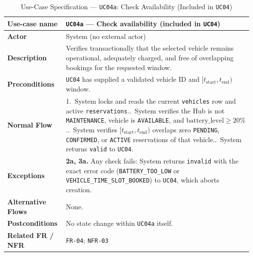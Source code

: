 \begin{table}[H]
  \centering
  \singlespacing\footnotesize
  \caption{Use-Case Specification --- \texttt{UC04a}: Check Availability (Included in \texttt{UC04})}
  \label{tab:uc04a}
  \renewcommand{\arraystretch}{1.13}
  \begin{tabularx}{\textwidth}{|L{2.9cm}|Y|}
    \hline
    \textbf{Use-case name} & \textbf{\texttt{UC04a} --- Check availability (included in \texttt{UC04})} \\
    \hline
    \textbf{Actor} & System (no external actor) \\
    \hline
    \textbf{Description} & Verifies transactionally that the selected vehicle remains operational, adequately charged, and free of overlapping bookings for the requested window. \\
    \hline
    \textbf{Preconditions} & \texttt{UC04} has supplied a validated vehicle ID and $[t_{\text{start}}, t_{\text{end}})$ window. \\
    \hline
    \textbf{Normal Flow} & 1.\ System locks and reads the current \texttt{vehicles} row and active \texttt{reservations}..\ System verifies the Hub is not \texttt{MAINTENANCE}, vehicle is \texttt{AVAILABLE}, and $\text{battery\_level} \ge 20\%$..\ System verifies $[t_{\text{start}}, t_{\text{end}})$ overlaps zero \texttt{PENDING}, \texttt{CONFIRMED}, or \texttt{ACTIVE} reservations of that vehicle..\ System returns \texttt{valid} to \texttt{UC04}. \\
    \hline
    \textbf{Exceptions} & \textbf{2a, 3a.} Any check fails: System returns \texttt{invalid} with the exact error code (\texttt{BATTERY\_\allowbreak TOO\_\allowbreak LOW} or \texttt{VEHICLE\_\allowbreak TIME\_\allowbreak SLOT\_\allowbreak BOOKED}) to \texttt{UC04}, which aborts creation. \\
    \hline
    \textbf{Alternative Flows} & None. \\
    \hline
    \textbf{Postconditions} & No state change within \texttt{UC04a} itself. \\
    \hline
    \textbf{Related FR / NFR} & \texttt{FR-04}; \texttt{NFR-03} \\
    \hline
  \end{tabularx}
\end{table}

